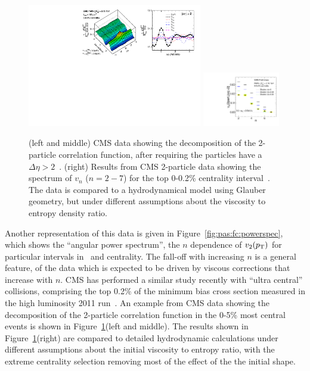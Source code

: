 \begin{figure}[!tb]
\begin{center}
\includegraphics[width=0.68\textwidth]{flowcorrelations_figs/corr1Dfit_UCC_centmin110_centmax1000_20131119.pdf}
\includegraphics[width=0.3\textwidth]{flowcorrelations_figs/compare_vnn_hydro_luzum_20120810.pdf}
\caption[]{
(left and middle) CMS data showing the decomposition of the 2-particle correlation function,
after requiring the particles have a $\Delta\eta>2$~\cite{CMS:2013bza}.
(right) Results from CMS 2-particle data showing the spectrum of $v_n$ ($n=2-7$) 
for the top 0-0.2\% centrality interval~\cite{CMS:2013bza}.
The data is compared to a hydrodynamical model using Glauber geometry, but
under different assumptions about the viscosity to entropy density ratio.
}
\label{fig:pas:fc:ucc}
\end{center}
\end{figure}

Another representation of this data is given in Figure~\ref{fig:pas:fc:powerspec}, which shows the ``angular power spectrum'',
the $n$ dependence of $v_2(\mbox{$p_{\mathrm{T}}$})$ for particular intervals in \pT\ and centrality.  The fall-off with increasing $n$ is a general
feature, of the data which is expected to be driven by viscous corrections that increase with $n$.
CMS has performed a similar study recently with ``ultra central'' collisions, comprising
the top 0.2\% of the minimum bias cross section measured in the high 
luminosity 2011 run~\cite{CMS:2013bza}.  
An example from CMS data showing the 
decomposition of the 2-particle correlation function in the 0-5\% most central
events is shown in Figure~\ref{fig:pas:fc:ucc}(left and middle).
The results shown in Figure~\ref{fig:pas:fc:ucc}(right)
are compared to detailed hydrodynamic calculations under
different assumptions about the initial viscosity to entropy ratio, with
the extreme centrality selection removing most of the effect of the 
the initial shape.

